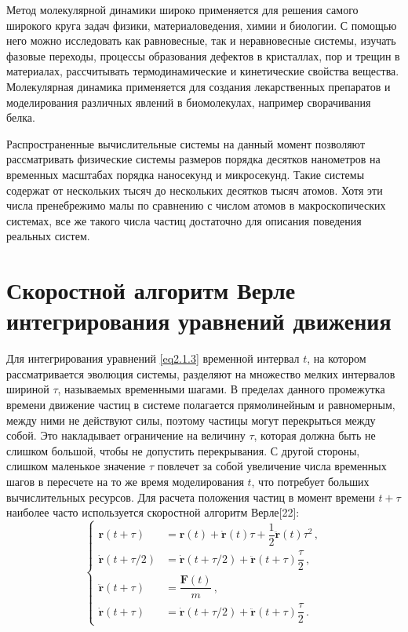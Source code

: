 \par Метод молекулярной динамики широко применяется для решения самого широкого круга задач физики, материаловедения, химии и биологии. С помощью него можно исследовать как равновесные, так и неравновесные системы, изучать фазовые переходы, процессы образования дефектов в кристаллах, пор и трещин в материалах, рассчитывать термодинамические и кинетические свойства вещества. Молекулярная динамика применяется для создания лекарственных препаратов и моделирования различных явлений в биомолекулах, например сворачивания белка.

\par Распространенные вычислительные системы на данный момент позволяют рассматривать физические системы размеров порядка десятков нанометров на временных масштабах порядка наносекунд и микросекунд. Такие системы содержат от нескольких тысяч до нескольких десятков тысяч атомов. Хотя эти числа пренебрежимо малы по сравнению с числом атомов в макроскопических системах, все же такого числа частиц достаточно для описания поведения реальных систем.

\section{Скоростной алгоритм Верле интегрирования уравнений движения}

Для интегрирования уравнений \eqref{eq2.1.3} временной интервал $t$, на котором рассматривается эволюция системы, разделяют на множество мелких интервалов шириной $\tau$, называемых временными шагами. В пределах данного промежутка времени движение частиц в системе полагается прямолинейным и равномерным, между ними не действуют силы, поэтому частицы могут перекрыться между собой. Это накладывает ограничение на величину $\tau$, которая должна быть не слишком большой, чтобы не допустить перекрывания. С другой стороны, слишком маленькое значение $\tau$ повлечет за собой увеличение числа временных шагов в пересчете на то же время моделирования $t$, что потребует больших вычислительных ресурсов. Для расчета положения частиц в момент времени $t+\tau$ наиболее часто используется скоростной алгоритм Верле[22]:
\begin{equation}
    \begin{cases}
        \mathbf{r}(t+\tau) &= \mathbf{r}(t) + \mathbf{\dot{r}}(t)\tau+\dfrac{1}{2}\mathbf{\ddot{r}}(t)\tau^2\,, \\
        \mathbf{\dot{r}}(t+\tau/2) &= \mathbf{\dot{r}}(t+\tau/2)+\mathbf{\ddot{r}}(t+\tau)\dfrac{\tau}{2}\,, \\
        \mathbf{\ddot{r}}(t+\tau) &= \dfrac{\mathbf{F}(t)}{m}\,, \\
        \mathbf{\dot{r}}(t+\tau) &= \mathbf{\dot{r}}(t+\tau/2) + \mathbf{\ddot{r}}(t+\tau)\dfrac{\tau}{2}\,.
    \end{cases}
    \label{eq2.2.1}
\end{equation}

